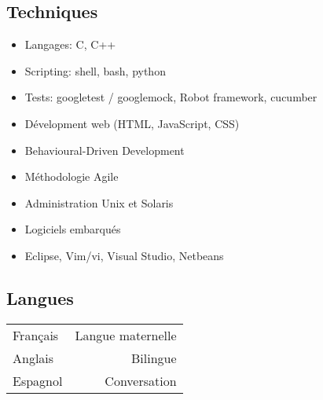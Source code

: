 \documentclass{cv}
\begin{document}
\subsection{Techniques}
\begin{itemize}
    \item {Langages: C, C++}
    \item {Scripting: shell, bash, python}
    \item {Tests: googletest / googlemock, Robot framework, cucumber}
    \item {Dévelopment web (HTML, JavaScript, CSS)}
    \item {Behavioural-Driven Development}
    \item {Méthodologie Agile}
    \item {Administration Unix et Solaris}
    \item {Logiciels embarqués}
    \item {Eclipse, Vim/vi, Visual Studio, Netbeans}
\end{itemize}

\subsection{Langues}
\begin{tabular}{L!{\VRule}R}
Français&Langue maternelle\\
Anglais&Bilingue\\
Espagnol&Conversation\\
\end{tabular}
\end{document}
